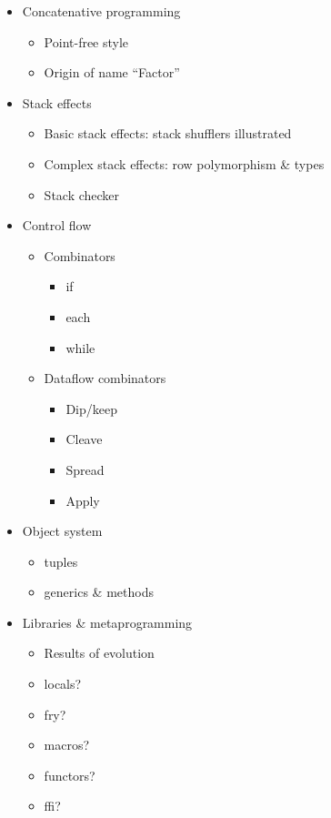 \begin{itemize}

\item Concatenative programming
      \begin{itemize}
        \item Point-free style
        \item Origin of name ``Factor''
      \end{itemize}

\item Stack effects
      \begin{itemize}
        \item Basic stack effects: stack shufflers illustrated
        \item Complex stack effects: row polymorphism \& types
        \item Stack checker
      \end{itemize}

\item Control flow
      \begin{itemize}
        \item Combinators
              \begin{itemize}
                \item if
                \item each
                \item while
              \end{itemize}
        \item Dataflow combinators
              \begin{itemize}
                \item Dip/keep
                \item Cleave
                \item Spread
                \item Apply
              \end{itemize}
      \end{itemize}

\item Object system
      \begin{itemize}
        \item tuples
        \item generics \& methods
      \end{itemize}

\item Libraries \& metaprogramming
      \begin{itemize}
        \item Results of evolution
        \item locals?
        \item fry?
        \item macros?
        \item functors?
        \item ffi?
      \end{itemize}

\end{itemize}


